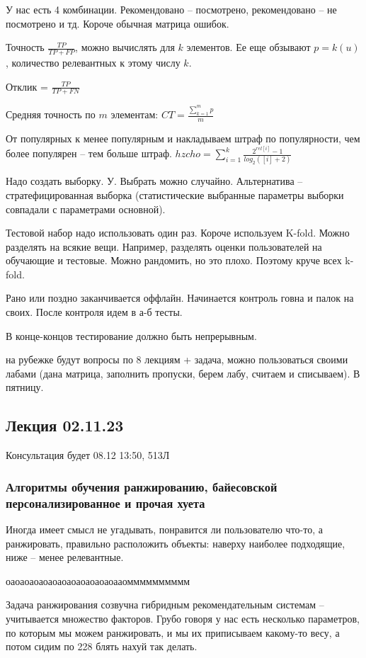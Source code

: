 У нас есть 4 комбинации. Рекомендовано -- посмотрено, рекомендовано -- не посмотрено и тд. Короче обычная матрица ошибок.

Точность $\frac{TP}{TP + FP}$, можно вычислять для $k$ элементов. Ее еще обзывают $p = k(u)$, количество релевантных к этому числу $k$.

Отклик = $\frac{TP}{TP + FN}$

Средняя точность по $m$ элементам: $CT = \frac{\sum^{m}_{k = 1}{p}}{m}$

От популярных к менее популярным и накладываем штраф по популярности, чем более популярен -- тем больше штраф. $hzcho = \sum^{k}_{i = 1}{\frac{2^{rel[i]} - 1}{log_2([i] + 2)}}$

Надо создать выборку. У. Выбрать можно случайно. Альтернатива -- стратефицированная выборка (статистические выбранные параметры выборки совпадали с параметрами основной).

Тестовой набор надо использовать один раз. Короче используем K-fold. Можно разделять на всякие вещи. Например, разделять оценки пользователей на обучающие и тестовые. Можно рандомить, но это плохо. Поэтому круче всех k-fold. 

Рано или поздно заканчивается оффлайн. Начинается контроль говна и палок на своих. После контроля идем в а-б тесты.

В конце-концов тестирование должно быть непрерывным.

на рубежке будут вопросы по 8 лекциям + задача, можно пользоваться своими лабами (дана матрица, заполнить пропуски, берем лабу, считаем и списываем). В пятницу.

\subsection{Лекция 02.11.23}

Консультация будет 08.12 13:50, 513Л

\subsubsection{Алгоритмы обучения ранжированию, байесовской персонализированное и прочая хуета}

Иногда имеет смысл не угадывать, понравится ли пользователю что-то, а ранжировать, правильно расположить объекты: наверху наиболее подходящие, ниже -- менее релевантные.

оаоаоаоаоаоаоаоаоаоаоаоааомммммммммм

Задача ранжирования созвучна гибридным рекомендательным системам -- учитывается множество факторов. Грубо говоря у нас есть несколько параметров, по которым мы можем ранжировать, и мы их приписываем какому-то весу, а потом сидим по 228 блять нахуй так делать.

